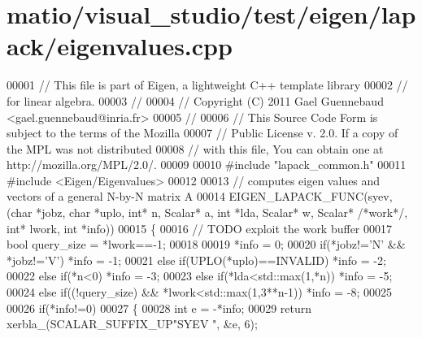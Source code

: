 \hypertarget{matio_2visual__studio_2test_2eigen_2lapack_2eigenvalues_8cpp_source}{}\section{matio/visual\+\_\+studio/test/eigen/lapack/eigenvalues.cpp}
\label{matio_2visual__studio_2test_2eigen_2lapack_2eigenvalues_8cpp_source}

\begin{DoxyCode}
00001 \textcolor{comment}{// This file is part of Eigen, a lightweight C++ template library}
00002 \textcolor{comment}{// for linear algebra.}
00003 \textcolor{comment}{//}
00004 \textcolor{comment}{// Copyright (C) 2011 Gael Guennebaud <gael.guennebaud@inria.fr>}
00005 \textcolor{comment}{//}
00006 \textcolor{comment}{// This Source Code Form is subject to the terms of the Mozilla}
00007 \textcolor{comment}{// Public License v. 2.0. If a copy of the MPL was not distributed}
00008 \textcolor{comment}{// with this file, You can obtain one at http://mozilla.org/MPL/2.0/.}
00009 
00010 \textcolor{preprocessor}{#include "lapack\_common.h"}
00011 \textcolor{preprocessor}{#include <Eigen/Eigenvalues>}
00012 
00013 \textcolor{comment}{// computes eigen values and vectors of a general N-by-N matrix A}
00014 EIGEN\_LAPACK\_FUNC(syev,(\textcolor{keywordtype}{char} *jobz, \textcolor{keywordtype}{char} *uplo, \textcolor{keywordtype}{int}* n, Scalar* a, \textcolor{keywordtype}{int} *lda, Scalar* w, Scalar* \textcolor{comment}{/*work*/}, \textcolor{keywordtype}{
      int}* lwork, \textcolor{keywordtype}{int} *info))
00015 \{
00016   \textcolor{comment}{// TODO exploit the work buffer}
00017   \textcolor{keywordtype}{bool} query\_size = *lwork==-1;
00018   
00019   *info = 0;
00020         \textcolor{keywordflow}{if}(*jobz!=\textcolor{charliteral}{'N'} && *jobz!=\textcolor{charliteral}{'V'})                    *info = -1;
00021   \textcolor{keywordflow}{else}  \textcolor{keywordflow}{if}(UPLO(*uplo)==INVALID)                        *info = -2;
00022   \textcolor{keywordflow}{else}  \textcolor{keywordflow}{if}(*n<0)                                        *info = -3;
00023   \textcolor{keywordflow}{else}  \textcolor{keywordflow}{if}(*lda<std::max(1,*n))                         *info = -5;
00024   \textcolor{keywordflow}{else}  \textcolor{keywordflow}{if}((!query\_size) && *lwork<std::max(1,3**n-1))  *info = -8;
00025     
00026   \textcolor{keywordflow}{if}(*info!=0)
00027   \{
00028     \textcolor{keywordtype}{int} e = -*info;
00029     \textcolor{keywordflow}{return} xerbla\_(SCALAR\_SUFFIX\_UP\textcolor{stringliteral}{"SYEV "}, &e, 6);

\end{DoxyCode}
